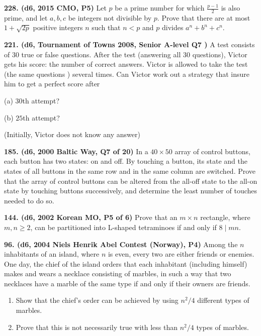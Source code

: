 \documentclass{article}
\begin{document}
        \textbf{228. (\color{red}d6\color{black}, 2015 CMO, P5)} Let $p$ be a prime number for which $\frac{p-1}{2}$ is also prime, and let $a,b,c$ be integers not divisible by $p$. Prove that there are at most $1+\sqrt {2p}$ positive integers $n$ such that $n<p$ and $p$ divides $a^n+b^n+c^n$.

        \textbf{221. (\color{red}d6\color{black}, Tournament of Towns 2008, Senior A-level Q7 )} A test consists of $30$ true or false questions. After the test (answering all $30$ questions), Victor gets his score: the number of correct answers. Victor is allowed to take the test (the same questions ) several times. Can Victor work out a strategy that insure him to get a perfect score after



        (a) $30$th attempt?



        (b) $25$th attempt?



        (Initially, Victor does not know any answer)

        \textbf{185. (\color{red}d6\color{black}, 2000 Baltic Way, Q7 of 20)} In a \(40 \times 50\) array of control buttons, each button has two states: on and off. By touching a button, its state and the states of all buttons in the same row and in the same column are switched. Prove that the array of control buttons can be altered from the all-off state to the all-on state by touching buttons successively, and determine the least number of touches needed to do so.

        \textbf{144. (\color{red}d6\color{black}, 2002 Korean MO, P5 of 6)} Prove that an \(m \times n\) rectangle, where \(m, n \geq 2\), can be partitioned into L-shaped tetraminoes if and only if \(8 \mid mn.\)

        \textbf{96. (\color{red}d6\color{black}, 2004 Niels Henrik Abel Contest (Norway), P4)} Among the \(n\) inhabitants of an island, where \(n\) is even, every two are either friends or enemies. One day, the chief of the island orders that each inhabitant (including himself) makes and wears a necklace consisting of marbles, in such a way that two necklaces have a marble of the same type if and only if their owners are friends.

        \begin{enumerate}

                \item Show that the chief's order can be achieved by using \(n^2/4\) different types of marbles.

                \item Prove that this is not necessarily true with less than \(n^2/4\) types of marbles.

        \end{enumerate}
\end{document}
